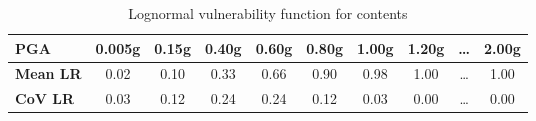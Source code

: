 \begin{table}[htbp]

\centering
\begin{tabular}{ l c c c c c c c c c }

\hline
\rowcolor{anti-flashwhite}
\bf{PGA} & \bf{0.005g} & \bf{0.15g} & \bf{0.40g} & \bf{0.60g} & \bf{0.80g} & \bf{1.00g} & \bf{1.20g} & \bf{\dots} & \bf{2.00g} \\
\hline
\bf{Mean LR} & 0.02 & 0.10 & 0.33 & 0.66 & 0.90 & 0.98 & 1.00 & \dots & 1.00 \\
\bf{CoV LR} & 0.03 & 0.12 & 0.24 & 0.24 & 0.12 & 0.03 & 0.00 & \dots & 0.00 \\
\hline
\end{tabular}

\caption{Lognormal vulnerability function for contents}
\label{tab:vf-ln-tax1-con}
\end{table}